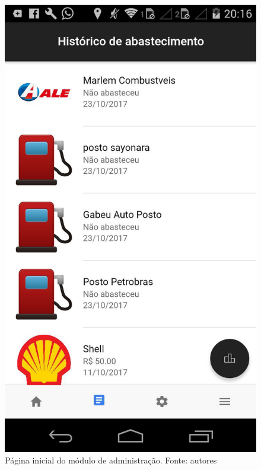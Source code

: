 \begin{figure}[H]
    \centering
    \includegraphics[scale=0.2]{figuras/historico-app.jpg}
    \caption[Página inicial do módulo de administração]{Página inicial do módulo de administração. Fonte: autores}
    \label{img:historico-app}
\end{figure}

